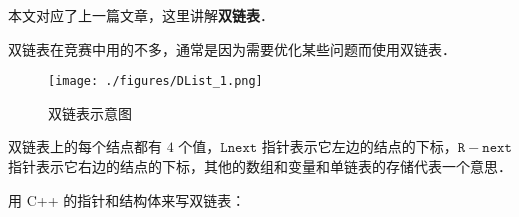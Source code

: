 
本文对应了上一篇文章，这里讲解\textbf{双链表}．

双链表在竞赛中用的不多，通常是因为需要优化某些问题而使用双链表．

\begin{figure}[ht]
\centering
\texttt{[image: ./figures/DList\_1.png]}
\caption{双链表示意图} \label{DList_fig1}
\end{figure}

双链表上的每个结点都有 $4$ 个值，$\mathtt{Lnext}$ 指针表示它左边的结点的下标，$\mathtt{R-next}$ 指针表示它右边的结点的下标，其他的数组和变量和单链表的存储代表一个意思．

用 C++ 的指针和结构体来写双链表：
